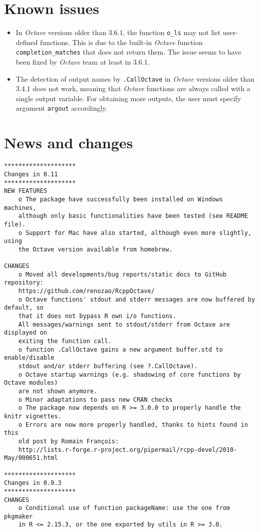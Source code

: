 \documentclass[english,10pt,a4paper]{article}\usepackage[]{graphicx}\usepackage[]{color}
\let\proglang=\textit
\let\code=\texttt
\newcommand{\octave}{\proglang{Octave}\xspace}
\begin{document}
\section{Known issues}
\label{sec:issues}

\begin{itemize}
 \item In \octave versions older than 3.6.1, the function \code{o\_ls} may not
 list user-defined functions. 
 This is due to the built-in \octave function \code{completion\_matches} that
 does not return them. The issue seems to have been fixed by \octave team at
 least in 3.6.1.
 \item The detection of output names by \code{.CallOctave} in \octave versions
 older than 3.4.1 does not work, meaning that \octave functions are always
 called with a single output variable.
 For obtaining more outputs, the user must specify argument \code{argout}
 accordingly.
\end{itemize}

\section{News and changes}

{\scriptsize
\begin{verbatim}
********************
Changes in 0.11
********************
NEW FEATURES
    o The package have successfully been installed on Windows machines, 
    although only basic functionalities have been tested (see README file).
    o Support for Mac have also started, although even more slightly, using
    the Octave version available from homebrew.

CHANGES
    o Moved all developments/bug reports/static docs to GitHub repository:
    https://github.com/renozao/RcppOctave/ 
    o Octave functions' stdout and stderr messages are now buffered by default, so 
    that it does not bypass R own i/o functions.
    All messages/warnings sent to stdout/stderr from Octave are displayed on 
    exiting the function call.
    o function .CallOctave gains a new argument buffer.std to enable/disable 
    stdout and/or stderr buffering (see ?.CallOctave).
    o Octave startup warnings (e.g. shadowing of core functions by Octave modules) 
    are not shown anymore.
    o Minor adaptations to pass new CRAN checks
    o The package now depends on R >= 3.0.0 to properly handle the knitr vignettes.
    o Errors are now more properly handled, thanks to hints found in this 
    old post by Romain François:
    http://lists.r-forge.r-project.org/pipermail/rcpp-devel/2010-May/000651.html

********************
Changes in 0.9.3
********************
CHANGES
    o Conditional use of function packageName: use the one from pkgmaker 
    in R <= 2.15.3, or the one exported by utils in R >= 3.0. 

\end{verbatim}
}
\end{document}
